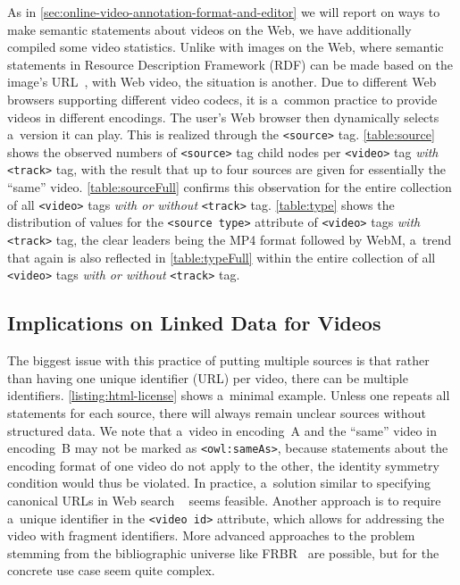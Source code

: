 \documentclass{sig-alternate-ceur}
\begin{document}
As in \autoref{sec:online-video-annotation-format-and-editor}
we will report on ways to make semantic statements
about videos on the Web,
we have additionally compiled some video statistics.
Unlike with images on the Web, where
semantic statements in
Resource Description Framework (RDF)
can be made based on the image's
URL~\cite{linsley2009rdfa},
with Web video, the situation is another.
Due to different Web browsers supporting
different video codecs,
it is a~common practice to provide videos
in different encodings.
The user's Web browser then dynamically selects
a~version it can play.
This is realized through the \texttt{<source>} tag.
\autoref{table:source} shows the observed numbers of
\texttt{<source>} tag child nodes per
\texttt{<video>} tag \emph{with} \texttt{<track>} tag,
with the result that up to
four sources are given for essentially the ``same'' video.
\autoref{table:sourceFull} confirms this observation
for the entire collection of all \texttt{<video>} tags
\emph{with or without} \texttt{<track>} tag.
\autoref{table:type} shows the distribution
of values for the \texttt{<source type>} attribute
of \texttt{<video>} tags \emph{with} \texttt{<track>} tag,
the clear leaders being the MP4 format
followed by WebM,
a~trend that again is also reflected
in \autoref{table:typeFull}
within the entire collection
of all \texttt{<video>} tags
\emph{with or without} \texttt{<track>} tag.

\subsection{Implications on Linked Data for Videos}
\label{sec:implications-on-linked-data-for-videos}

The biggest issue with this practice
of putting multiple sources is that
rather than having one unique identifier (URL) per video,
there can be multiple identifiers.
\autoref{listing:html-license} shows a~minimal example.
Unless one repeats all statements for each source,
there will always remain unclear sources without structured data.
We note that a~video in encoding~A
and the ``same'' video in encoding~B
may not be marked as \texttt{<owl:sameAs>},
because statements about the encoding format
of one video do not apply to the other,
the identity symmetry condition would thus be violated.
In practice, a~solution similar to
specifying canonical URLs in Web search%
~\cite{kupke2009canonical} seems feasible.
Another approach is to require a~unique identifier
in the \texttt{<video id>} attribute,
which allows for addressing the video
with fragment identifiers.
More advanced approaches to the problem
stemming from the bibliographic universe
like FRBR~\cite{tillett2004frbr} are possible,
but for the concrete use case seem quite complex.
\end{document}
